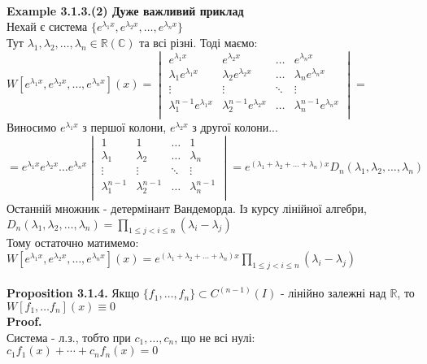 \documentclass[a4paper, 14pt]{extarticle}
\def\huge{\displaystyle}
\def\ex#1{\textbf{Example {#1}}}
\def\prp#1{\textbf{Proposition {#1}}}
\def\proof{\textbf{Proof.}\\}
\def\bigline{\vspace{5mm}\\}
\begin{document}
	\bigline
	\ex{3.1.3.(2) Дуже важливий приклад}\\
	Нехай є система $\huge \{e^{\lambda_1 x}, e^{\lambda_2 x}, \dots, e^{\lambda_n x}\}$\\
	Тут $\lambda_1, \lambda_2, \dots, \lambda_n \in \mathbb{R} (\mathbb{C})$ та всі різні. Тоді маємо:\\
	$\huge W[e^{\lambda_1 x}, e^{\lambda_2 x}, \dots, e^{\lambda_n x}](x) = 
\begin{vmatrix} 
	e^{\lambda_1 x} &  e^{\lambda_2 x} & \dots & e^{\lambda_n x} \\ 
	\lambda_1 e^{\lambda_1 x} &  \lambda_2 e^{\lambda_2 x} & \dots & \lambda_n e^{\lambda_n x} \\ 
	\vdots &  \vdots & \ddots & \vdots \\
	\lambda_1^{n-1} e^{\lambda_1 x} &  \lambda_2^{n-1} e^{\lambda_2 x} & \dots & \lambda_n^{n-1} e^{\lambda_n x} \\
\end{vmatrix} \boxed{=}$\\
Виносимо $e^{\lambda_1 x}$ з першої колони, $e^{\lambda_2 x}$ з другої колони...\\
$\huge \boxed{=}
e^{\lambda_1 x} e^{\lambda_2 x} \dots e^{\lambda_n x}
\begin{vmatrix} 
	1 &  1 & \dots &  1 \\ 
	\lambda_1 &  \lambda_2 & \dots & \lambda_n \\ 
	\vdots &  \vdots & \ddots & \vdots \\
	\lambda_1^{n-1} &  \lambda_2^{n-1} & \dots & \lambda_n^{n-1} \\
\end{vmatrix} = e^{(\lambda_1+\lambda_2+\dots+\lambda_n)x} D_n(\lambda_1, \lambda_2, \dots, \lambda_n)
$\\
Останній множник - детермінант Вандеморда. Із курсу лінійної алгебри,\\
$\huge D_n(\lambda_1, \lambda_2, \dots, \lambda_n) = \prod_{1 \leq j < i \leq n} (\lambda_i-\lambda_j)$\\
Тому остаточно матимемо:\\
$\huge W[e^{\lambda_1 x}, e^{\lambda_2 x}, \dots, e^{\lambda_n x}](x) = e^{(\lambda_1+\lambda_2+\dots+\lambda_n)x} \prod_{1 \leq j < i \leq n} (\lambda_i-\lambda_j)$\\
\bigline
\prp{3.1.4.} Якщо $\{f_1, \dots, f_n\} \subset C^{(n-1)}(I)$ - лінійно залежні над $\mathbb{R}$, то $W[f_1,\dots f_n](x) \equiv 0$\\
\proof
Система - л.з., тобто при $c_1, \dots, c_n$, що не всі нулі: \\$c_1f_1(x) + \cdots + c_n f_n(x) = 0$
\end{document}
